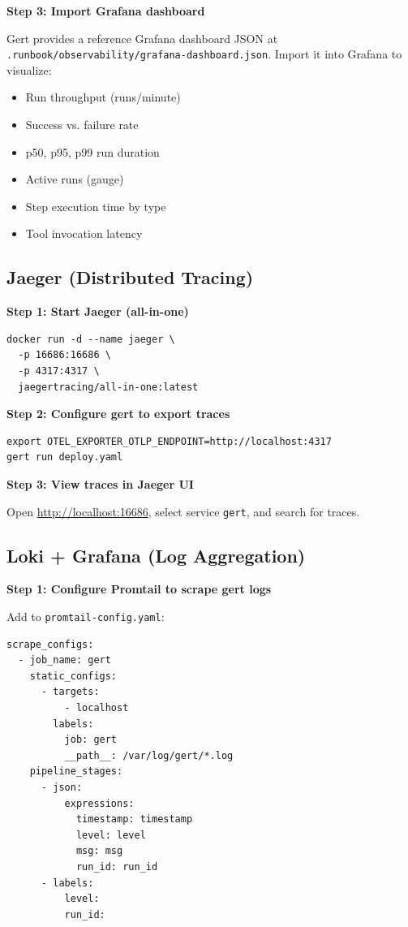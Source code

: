\textbf{Step 3: Import Grafana dashboard}

Gert provides a reference Grafana dashboard JSON at \texttt{.runbook/observability/grafana-dashboard.json}. Import it into Grafana to visualize:
\begin{itemize}
  \item Run throughput (runs/minute)
  \item Success vs. failure rate
  \item p50, p95, p99 run duration
  \item Active runs (gauge)
  \item Step execution time by type
  \item Tool invocation latency
\end{itemize}

\subsection{Jaeger (Distributed Tracing)}

\textbf{Step 1: Start Jaeger (all-in-one)}
\begin{verbatim}
docker run -d --name jaeger \
  -p 16686:16686 \
  -p 4317:4317 \
  jaegertracing/all-in-one:latest
\end{verbatim}

\textbf{Step 2: Configure gert to export traces}
\begin{verbatim}
export OTEL_EXPORTER_OTLP_ENDPOINT=http://localhost:4317
gert run deploy.yaml
\end{verbatim}

\textbf{Step 3: View traces in Jaeger UI}

Open \url{http://localhost:16686}, select service \texttt{gert}, and search for traces.

\subsection{Loki + Grafana (Log Aggregation)}

\textbf{Step 1: Configure Promtail to scrape gert logs}

Add to \texttt{promtail-config.yaml}:
\begin{verbatim}
scrape_configs:
  - job_name: gert
    static_configs:
      - targets:
          - localhost
        labels:
          job: gert
          __path__: /var/log/gert/*.log
    pipeline_stages:
      - json:
          expressions:
            timestamp: timestamp
            level: level
            msg: msg
            run_id: run_id
      - labels:
          level:
          run_id:
\end{verbatim}

